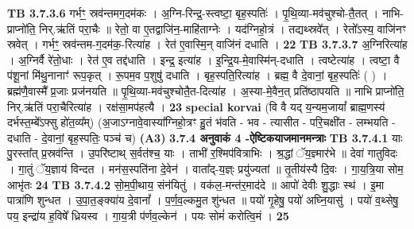 \documentclass[17pt]{extarticle}
\begin{document}
{{{{{{{{{{{{{{{{{{{                  \newline
                                \textbf{ TB 3.7.3.6} \newline
                  गर्भꣳ॒॒ स्रव॑न्तमग॒दम॑कः । अ॒ग्नि-रिन्द्र॒-स्त्वष्टा॒ बृह॒स्पतिः॑ । पृ॒थि॒व्या-मव॑चुश्चो-तै॒तत् । नाभि-प्राप्नो॑ति॒ निर्.ऋ॑तिं परा॒चैः ॥ रेतो॒ वा ए॒तद्वाजि॑न॒-माहि॑ताग्नेः । यद॑ग्निहो॒त्रं । तद्यथ्स्रवे᳚त् । रेतो᳚ऽस्य॒ वाजि॑नꣳ स्रवेत् । गर्भꣳ॒॒ स्रव॑न्तम-ग॒दम॑क॒-रित्या॑ह । रेत॑ ए॒वास्मि॒न् वाजि॑नं दधाति । \textbf{ 22} \newline
                  \newline
                                \textbf{ TB 3.7.3.7} \newline
                  अ॒ग्निरित्या॑ह । अ॒ग्निर्वै रे॑तो॒धाः । रेत॑ ए॒व तद्द॑धाति । इन्द्र॒ इत्या॑ह । इ॒न्द्रि॒य-मे॒वास्मि॑न्-दधाति । त्वष्टेत्या॑ह । त्वष्टा॒ वै प॑शू॒नां मि॑थु॒नानाꣳ॑ रूप॒कृत् । रू॒पम॒व प॒शुषु॑ दधाति । बृह॒स्पति॒रित्या॑ह । ब्रह्म॒ वै दे॒वानां॒ बृह॒स्पतिः॑ ( ) । ब्रह्म॑णै॒वास्मै᳚ प्र॒जाः प्रज॑नयति ॥ पृ॒थि॒व्या-मव॑चुश्चोतै॒त-दित्या॑ह । अ॒स्या-मे॒वैन॒त् प्रति॑ष्ठापयति ॥ नाभि प्राप्नो॑ति॒ निर्.ऋ॑तिं परा॒चैरित्या॑ह । रक्ष॑सा॒मप॑हत्यै । \textbf{ 23} \newline
                  \newline
                                                        \textbf{special korvai} \newline
              (वि वै यद् य॒न्यम॒जायां᳚ ब्राह्म॒णस्य॑ दर्भस्त॒म्बे᳚ऽफ्सु हो॑त॒व्य᳚म्) \newline
                                (अ॒जाऽग्नावे॒वास्या᳚ग्निहो॒त्रꣳ हु॒तं भ॑वति - भव - त्यासीत - परि॒चक्षी॑त - लम्भयति - दधाति - दे॒वानां॒ बृह॒स्पतिः॒ पञ्च॑ च) \textbf{(A3)} \newline \newline
                \textbf{ 3.7.4     अनुवाकं   4 -ऐष्टिकयाजमानमन्त्राः} \newline
                                \textbf{ TB 3.7.4.1} \newline
                  याः पु॒रस्ता᳚त् प्र॒स्रव॑न्ति । उ॒परि॑ष्टाथ् स॒र्वत॑श्च॒ याः । ताभी॑ र॒श्मिप॑वित्राभिः । श्र॒द्धां ॅय॒ज्ञ्मार॑भे ॥ देवा॑ गातुविदः । गा॒तुं ॅय॒ज्ञाय॑ विन्दत । मन॑स॒स्पति॑ना दे॒वेन॑ । वाता᳚द्-य॒ज्ञ्ः प्रयु॑ज्यतां ॥ तृ॒तीय॑स्यै दि॒वः । गा॒य॒त्रि॒या सोम॒ आभृ॑तः \textbf{ 24} \newline
                  \newline
                                \textbf{ TB 3.7.4.2} \newline
                  सो॒म॒पी॒थाय॒ संन॑यितुं । वक॑ल॒-मन्त॑र॒माद॑दे ॥ आपो॑ देवीः शु॒द्धाः स्थ॑ । इ॒मा पात्रा॑णि शुन्धत । उ॒पा॒त॒ङ्क्या॑य दे॒वानां᳚ । प॒र्ण॒व॒ल्कमु॒त शु॑न्धत ॥ पयो॑ गृ॒हेषु॒ पयो॑ अघ्नि॒यासु॑ । पयो॑ व॒थ्सेषु॒ पय॒ इन्द्रा॑य ह॒विषे᳚ ध्रियस्व । गा॒य॒त्री प॑र्णव॒ल्केन॑ । पयः सोमं॑ करोत्वि॒मं । \textbf{ 25} \newline
}}}}}}}}}}}}}}}}}}}
\end{document}
